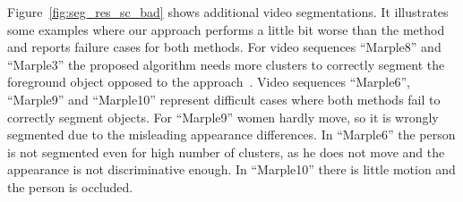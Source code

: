 Figure~\ref{fig:seg_res_sc_bad} shows additional video segmentations. It illustrates some examples where our approach performs a little bit worse than the method~\cite{GalassoCS12} and reports failure cases for both methods.
For video sequences ``Marple8'' and ``Marple3'' the proposed algorithm needs more clusters to correctly segment the foreground object opposed to the approach~\cite{GalassoCS12}.
Video sequences ``Marple6'', ``Marple9'' and ``Marple10'' represent difficult cases where both methods fail to correctly segment objects. For ``Marple9'' women hardly move, so it is wrongly segmented due to the misleading
appearance differences. In ``Marple6'' the person is not segmented even for high number of clusters, as he does not move and the appearance is not discriminative enough. In ``Marple10'' there is little motion and the person is
occluded.
\renewcommand*{\thesubfigure}{}
